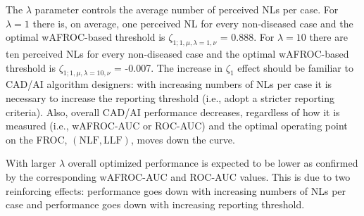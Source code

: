 \documentclass[
]{book}
\begin{document}
\begin{table}[H]

\caption{\label{tab:optim-op-point-table-vary-nu}Summary of optimization results for $\mu = 2$, $\lambda = 1$ and 4 values of $\nu$.}
\centering
{}
\end{table}

The \(\lambda\) parameter controls the average number of perceived NLs per case. For \(\lambda = 1\) there is, on average, one perceived NL for every non-diseased case and the optimal wAFROC-based threshold is \(\zeta_{1;1,\mu, \lambda = 1, \nu}\) = 0.888. For \(\lambda = 10\) there are ten perceived NLs for every non-diseased case and the optimal wAFROC-based threshold is \(\zeta_{1;1,\mu, \lambda = 10, \nu}\) = -0.007. The increase in \(\zeta_1\) effect should be familiar to CAD/AI algorithm designers: with increasing numbers of NLs per case it is necessary to increase the reporting threshold (i.e., adopt a stricter reporting criteria). Also, overall CAD/AI performance decreases, regardless of how it is measured (i.e., wAFROC-AUC or ROC-AUC) and the optimal operating point on the FROC, \(\left( \text{NLF}, \text{LLF}\right)\), moves down the curve.

With larger \(\lambda\) overall optimized performance is expected to be lower as confirmed by the corresponding wAFROC-AUC and ROC-AUC values. This is due to two reinforcing effects: performance goes down with increasing numbers of NLs per case and performance goes down with increasing reporting threshold.
\end{document}

